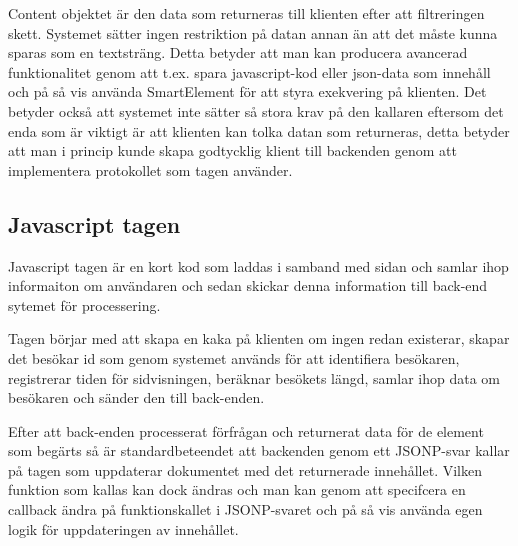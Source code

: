 Content objektet är den data som returneras till klienten efter att filtreringen skett. Systemet sätter ingen restriktion på datan annan än att det måste kunna sparas som en textsträng. Detta betyder att man kan producera avancerad funktionalitet genom att t.ex. spara javascript-kod eller json-data som innehåll och på så vis använda SmartElement för att styra exekvering på klienten. Det betyder också att systemet inte sätter så stora krav på den kallaren eftersom det enda som är viktigt är att klienten kan tolka datan som returneras, detta betyder att man i princip kunde skapa godtycklig klient till backenden genom att implementera protokollet som tagen använder.

\subsection{Javascript tagen}

Javascript tagen är en kort kod som laddas i samband med sidan och samlar ihop informaiton om användaren och sedan skickar denna information till back-end sytemet för processering.

Tagen börjar med att skapa en kaka på klienten om ingen redan existerar, skapar det besökar id som genom systemet används för att identifiera besökaren, registrerar tiden för sidvisningen, beräknar besökets längd, samlar ihop data om besökaren och sänder den till back-enden.

Efter att back-enden processerat förfrågan och returnerat data för de element som begärts så är standardbeteendet att backenden genom ett JSONP-svar kallar på tagen som uppdaterar dokumentet med det returnerade innehållet. Vilken funktion som kallas kan dock ändras och man kan genom att specifcera en callback ändra på funktionskallet i JSONP-svaret och på så vis använda egen logik för uppdateringen av innehållet.


